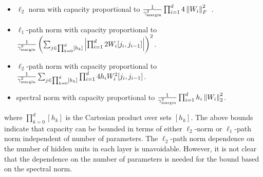 \documentclass{article}
\begin{document}
\begin{itemize}
\item $\ell_2$ norm with capacity proportional to $\frac{1}{\gamma_{\text{margin}}^2}\prod_{i=1}^d 4\left\lVert{W_i}\right\rVert^2_F$~\cite{NeyTomSre15}.
\item $\ell_1$-path norm with capacity proportional to $\frac{1}{\gamma_{\text{margin}}^2}\left(\sum_{j \in \prod_{k=0}^d[h_k]}\left\lvert{\prod_{i=1}^d 2W_i[j_i,j_{i-1}]}\right\rvert\right)^2$\cite{bartlett2002rademacher,NeyTomSre15}.
\item $\ell_2$-path norm with capacity proportional to $\frac{1}{\gamma_{\text{margin}}^2}\sum_{j \in \prod_{k=0}^d[h_k]}\prod_{i=1}^d 4h_iW_i^2[j_i,j_{i-1}]$.
\item spectral norm with capacity proportional to $\frac{1}{\gamma_{\text{margin}}^2}\prod_{i=1}^d h_i\left\lVert{W_i}\right\rVert^2_2$.
\end{itemize}
where $\prod_{k=0}^d[h_k]$ is the Cartesian product over sets $[h_k]$. The above bounds indicate that capacity can be bounded in terms of either $\ell_2$-norm or $\ell_1$-path norm independent of number of parameters. The $\ell_2$-path norm dependence on the number of hidden units in each layer is unavoidable. However, it is not clear that the dependence on the number of parameters is needed for the bound based on the spectral norm. 

\end{document}
